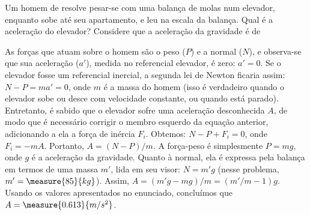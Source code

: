 \begin{question}
    Um homem de  resolve pesar-se com uma balança de molas num elevador, enquanto sobe até seu apartamento, e leu  na escala da balança.
    Qual é a aceleração do elevador?
    Considere que a aceleração da gravidade é de 

    \begin{answer}
    \end{answer}

    \begin{solution}
      As forças que atuam sobre o homem são o peso ($P$) e a normal ($N$), e observa-se que sua aceleração ($a'$), medida no referencial elevador, é zero: $a' = 0$.
      Se o elevador fosse um referencial inercial, a segunda lei de Newton ficaria assim: $N - P = ma' = 0$, onde $m$ é a massa do homem (isso é verdadeiro quando o elevador sobe ou desce com velocidade constante, ou quando está parado).
      Entretanto, é sabido que o elevador sofre uma aceleração desconhecida $A$, de modo que é necessário corrigir o membro esquerdo da equação anterior, adicionando a ela a força de inércia $F_i$.
      Obtemos: $N - P + F_i = 0$, onde $F_i = -mA$.
      Portanto, $A = (N - P)/m$.
      A força-peso é simplesmente $P = mg$, onde $g$ é a aceleração da gravidade.
      Quanto à normal, ela é expressa pela balança em termos de uma massa $m'$, lida em seu visor: $N = m'g$ (nesse problema, $m' = \measure{85}{kg}$).
      Assim, $A = (m'g - mg)/m = (m'/m - 1)g$.
      Usando os valores apresentados no enunciado, concluímos que $A = \measure{0.613}{m/s^2}$.
    \end{solution}
\end{question}